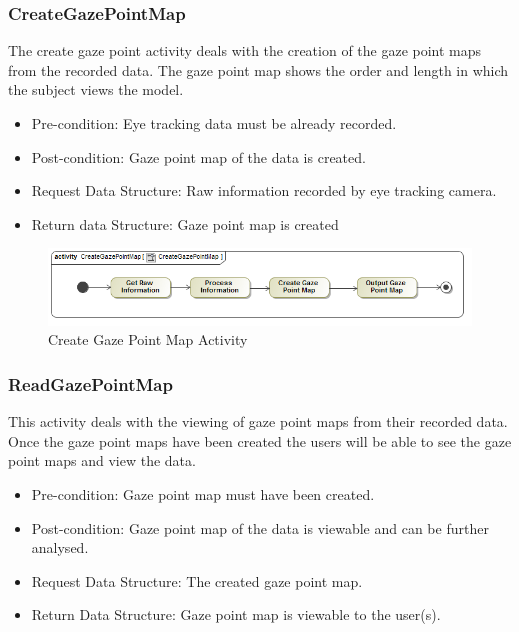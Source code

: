 	\subsubsection{CreateGazePointMap}
The create gaze point activity deals with the creation of the gaze point maps from the recorded data. The gaze point map shows the order and length in which the subject views the model.
	\begin{itemize}
		\item Pre-condition: Eye tracking data must be already recorded.
		\item Post-condition: Gaze point map of the data is created.
		\item Request Data Structure: Raw information recorded by eye tracking camera.
		\item Return data Structure: Gaze point map is created
	\end{itemize}
	\begin{figure}[!ht]
		\centering
		\includegraphics[scale=0.5]{Diagrams/Activity_Diagram__CreateGazePointMap__CreateGazePointMap.png}
		\caption{Create Gaze Point Map Activity}
	\end{figure}
	
	\subsubsection{ReadGazePointMap}
	This activity deals with the viewing of gaze point maps from their recorded data. Once the gaze point maps have been created the users will be able to see the gaze point maps and view the data.
	\begin{itemize}
		\item Pre-condition: Gaze point map must have been created.
		\item Post-condition: Gaze point map of the data is viewable and can be further analysed.
		\item Request Data Structure: The created gaze point map.
		\item Return Data Structure: Gaze point map is viewable to the user(s).
	\end{itemize}
	
